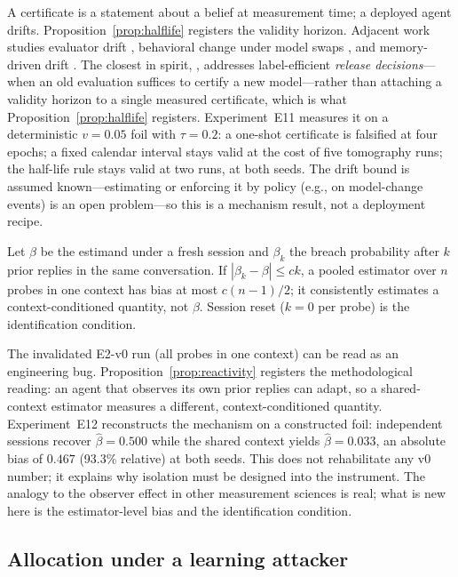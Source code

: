 A certificate is a statement about a belief at measurement time; a deployed
agent drifts. Proposition~\ref{prop:halflife} registers the validity
horizon. Adjacent work studies evaluator drift \cite{evaldrift2026},
behavioral change under model swaps \cite{modeltransition2026}, and
memory-driven drift \cite{memevo2026}. The closest in spirit,
\cite{evaldrift2026}, addresses label-efficient \emph{release
decisions}---when an old evaluation suffices to certify a new model---rather
than attaching a validity horizon to a single measured certificate, which is
what Proposition~\ref{prop:halflife} registers. Experiment~E11 measures it on a deterministic $v=0.05$
foil with $\tau=0.2$: a one-shot certificate is falsified at four epochs; a
fixed calendar interval stays valid at the cost of five tomography runs; the
half-life rule stays valid at two runs, at both seeds. The drift bound is
assumed known---estimating or enforcing it by policy (e.g., on model-change
events) is an open problem---so this is a mechanism result, not a deployment
recipe.

\begin{proposition}\label{prop:reactivity}
Let $\beta$ be the estimand under a fresh session and $\beta_k$ the breach
probability after $k$ prior replies in the same conversation. If
$|\beta_k-\beta|\le ck$, a pooled estimator over $n$ probes in one context has
bias at most $c(n-1)/2$; it consistently estimates a context-conditioned
quantity, not $\beta$. Session reset ($k=0$ per probe) is the identification
condition.
\end{proposition}

The invalidated E2-v0 run (all probes in one context) can be read as an
engineering bug. Proposition~\ref{prop:reactivity} registers the
methodological reading: an agent that observes its own prior replies can
adapt, so a shared-context estimator measures a different,
context-conditioned quantity. Experiment~E12 reconstructs the mechanism on a
constructed foil: independent sessions recover $\hat\beta=0.500$ while the
shared context yields $\hat\beta=0.033$, an absolute bias of $0.467$
(93.3\% relative) at both seeds. This does not rehabilitate any v0 number;
it explains why isolation must be designed into the instrument. The analogy
to the observer effect in other measurement sciences is real; what is new
here is the estimator-level bias and the identification condition.

\subsection{Allocation under a learning attacker}\label{sec:learned}

